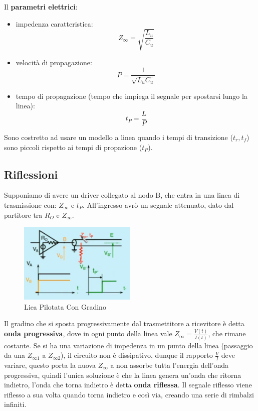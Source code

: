 \documentclass[12pt]{article}
\begin{document}
Il \textbf{parametri elettrici}:
\begin{itemize}
    \item impedenza caratteristica:
        \[ Z _{\infty} = \sqrt{\frac{L_u}{C_u} } \]
    \item velocit\`a di propagazione:
        \[ P = \frac{1}{\sqrt{L_uC_u}}  \]
    \item tempo di propagazione (tempo che impiega il segnale per spostarsi lungo la linea):
        \[ t_P = \frac{L}{P}  \]
\end{itemize}

Sono costretto ad usare un modello a linea quando i tempi di transizione ($t_r, t_f$) sono piccoli rispetto ai tempi di propazione ($t_P$).


\subsection{Riflessioni}
Supponiamo di avere un driver collegato al nodo B, che entra in una linea di trasmissione con: $Z _{\infty}$ e $t_P$. All'ingresso avr\`o un segnale attenuato, dato dal partitore tra $R_O$ e $Z _{\infty}$.
\begin{figure}[H]
    \centering
    \includegraphics[width=0.5\textwidth]{liea-pilotata-con-gradino.png}
    \caption{Liea Pilotata Con Gradino}
    \label{fig:liea-pilotata-con-gradino}
\end{figure}

Il gradino che si sposta progressivamente dal trasmettitore a ricevitore \`e detta \textbf{onda progressiva}, dove in ogni punto della linea vale $Z _{\infty} = \frac{V(t)}{I(t)} $, che rimane costante. Se si ha una variazione di impedenza in un punto della linea (passaggio da una $Z _{\infty1}$ a $Z _{\infty2}$), il circuito non \`e dissipativo, dunque il rapporto $\frac{V}{I}$ deve variare, questo porta la nuova $Z _{\infty}$ a non assorbe tutta l'energia dell'onda progressiva, quindi l'unica soluzione \`e che la linea genera un'onda che ritorna indietro, l'onda che torna indietro \`e detta \textbf{onda riflessa}. Il segnale riflesso viene riflesso a sua volta quando torna indietro e cos\`i via, creando una serie di rimbalzi infiniti.
\end{document}
